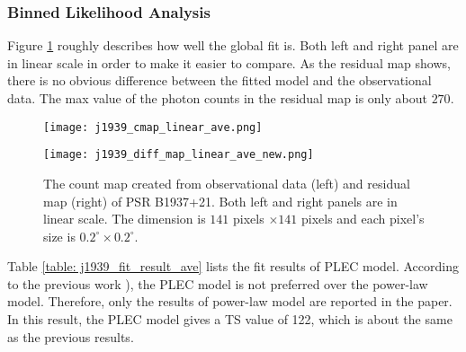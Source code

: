 \documentclass[a4paper, 12pt]{report}
\begin{document}
      \subsubsection{Binned Likelihood Analysis}
        Figure \ref{fig: j1939_count_map_diff_ave} roughly describes how well the global fit 
        is. Both left and right panel are in linear scale in order to make it easier to 
        compare. As the residual map shows, there is no obvious difference between the fitted 
        model and the observational data. The max value of the photon counts in the residual map 
        is only about $270$. 
        \begin{figure}[!htp]
          \begin{center}
          \begin{minipage}{0.45\textwidth}
            \begin{center} 
              \texttt{[image: j1939\_cmap\_linear\_ave.png]}
            \end{center}
          \end{minipage}
          \begin{minipage}{0.45\textwidth}
            \begin{center}
              \texttt{[image: j1939\_diff\_map\_linear\_ave\_new.png]}
            \end{center}
          \end{minipage}
          \end{center}
            \caption[The count map created from observational data (left) and residual map 
              (right) of PSR B1937+21.]
              {The count map created from observational data (left) and residual map (right)
              of PSR B1937+21. Both left and right panels are in linear scale. 
              The dimension is $141$ pixels $\times 141$ pixels and each pixel's 
              size is $0.2^{\circ}\times0.2^{\circ}$.}
            \label{fig: j1939_count_map_diff_ave}
        \end{figure}

        Table \ref{table: j1939_fit_result_ave} lists the fit results of PLEC model. 
        According to the previous work \cite{0004-637X-787-2-167}), 
        the PLEC model is not preferred over the power-law model. Therefore, only 
        the results of power-law model are reported in the paper. In this result, the 
        PLEC model gives a TS value of 122, which is about the same as the previous 
        results. 
\end{document}
